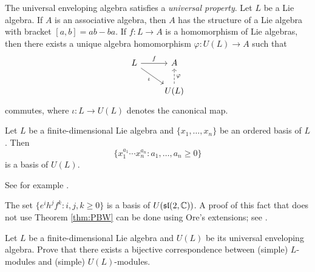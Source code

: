 The universal enveloping algebra satisfies a \emph{universal property}. 
Let $L$ be a Lie algebra. If $A$ is an associative algebra, then
$A$ has the structure of a Lie algebra with
bracket 
$[a,b]=ab-ba$. If $f\colon L\to A$ is a homomorphism of Lie algebras, 
then there exists a unique algebra homomorphism
$\varphi\colon U(L)\to A$ such that 
\[
\begin{tikzcd}
	L & A \\
	& U(L)
	\arrow["f", from=1-1, to=1-2]
	\arrow["{\iota }"', from=1-1, to=2-2]
	\arrow["\varphi"', dashed, from=2-2, to=1-2]
\end{tikzcd}
\]
commutes, where $\iota\colon L\to U(L)$ 
denotes the canonical map. 


\begin{theorem}
    \label{thm:PBW}
    Let $L$ be a finite-dimensional Lie algebra and 
    $\{x_1,\dots,x_n\}$ be an ordered basis of $L$. Then 
    \[
    \{x_1^{a_1}\cdots x_n^{a_n}:a_1,\dots,a_n\geq0\}
    \]
    is a basis of $U(L)$. 
\end{theorem}

See for example \cite[\S17.4]{MR499562}. 

\begin{example}
    The set $\{e^ih^jf^k:i,j,k\geq0\}$ is a basis of $U(\mathfrak{sl}(2,\mathbb{C}))$. A proof of this 
    fact that does not use Theorem \ref{thm:PBW} 
    can be done using Ore's extensions; see \cite[Proposition 3.2]{MR1321145}.
\end{example}


\begin{exercise}
    Let $L$ be a finite-dimensional Lie algebra and $U(L)$ be its
    universal enveloping algebra. Prove that there exists a bijective
    correspondence between (simple) $L$-modules and (simple) $U(L)$-modules. 
\end{exercise}
